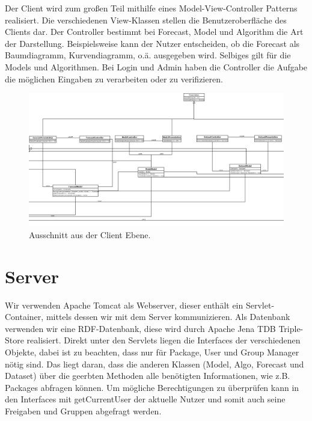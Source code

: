 \documentclass[oneside]{book}
\begin{document}
Der Client wird zum gro\ss{}en Teil mithilfe eines Model-View-Controller Patterns realisiert. Die verschiedenen View-Klassen stellen die Benutzeroberfläche des Clients dar. Der Controller bestimmt bei Forecast, Model und Algorithm die Art der Darstellung. Beispielsweise kann der Nutzer entscheiden, ob die Forecast als Baumdiagramm, Kurvendiagramm, o.\"a. ausgegeben wird. Selbiges gilt f\"ur die Models und Algorithmen. Bei Login und Admin haben die Controller die Aufgabe die m\"oglichen Eingaben zu verarbeiten oder zu verifizieren. 
 \begin{figure}[ht]
 	\centering
 	\includegraphics[scale=0.4]{Client.png}
 	\caption{Ausschnitt aus der Client Ebene.}
 \end{figure}



\chapter{Server}

Wir verwenden Apache Tomcat als Webserver, dieser enth\"alt ein Servlet-Container, mittels dessen wir mit dem Server kommunizieren. Als Datenbank verwenden wir eine RDF-Datenbank, diese wird durch Apache Jena TDB Triple-Store realisiert. 
Direkt unter den Servlets liegen die Interfaces der verschiedenen Objekte, dabei ist zu beachten, dass nur f\"ur Package, User und Group Manager n\"otig sind. Das liegt daran, dass die anderen Klassen (Model, Algo, Forecast und Dataset) \"uber die geerbten Methoden alle ben\"otigten Informationen, wie z.B. Packages abfragen k\"onnen. Um m\"ogliche Berechtigungen zu \"uberpr\"ufen kann in den Interfaces mit getCurrentUser der aktuelle Nutzer und somit auch seine Freigaben und Gruppen abgefragt werden.
\end{document}
